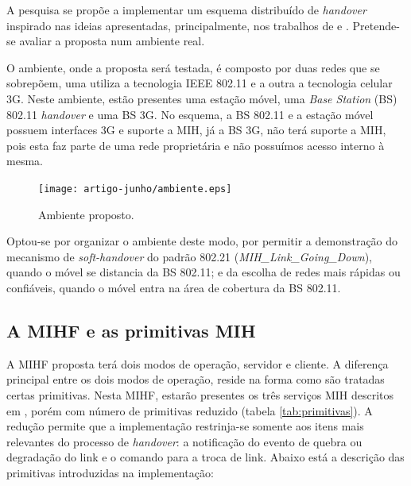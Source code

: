 \documentclass[12pt]{article}
\begin{document}
A pesquisa se propõe a implementar um esquema distribuído de \textit{handover} 
inspirado nas ideias apresentadas, principalmente, nos trabalhos de  
\cite{machan:2008} e \cite{tawil:2008}. Pretende-se avaliar a proposta num 
ambiente real.

O ambiente, onde a proposta será testada, é composto por duas redes que se 
sobrepõem, uma utiliza a tecnologia IEEE 802.11 e a outra a tecnologia celular 
3G.  Neste ambiente, estão presentes uma estação móvel, uma \textit{Base 
Station} (BS) 802.11 \textit{handover} e uma BS 3G.  No esquema, a BS 802.11 e 
a estação móvel possuem interfaces 3G e suporte a MIH, já a BS 3G, não terá 
suporte a MIH, pois esta faz parte de uma rede proprietária e não possuímos 
acesso interno à mesma.

\begin{figure}[h!]
	\centering
	\texttt{[image: artigo-junho/ambiente.eps]}
	\caption{Ambiente proposto.}
	\label{fig:ambiente}
\end{figure}

Optou-se por organizar o ambiente deste modo, por permitir a demonstração do 
mecanismo de \textit{soft-handover} do padrão 802.21 
(\textit{MIH\_Link\_Going\_Down}), quando o móvel se distancia da BS 802.11; e 
da escolha de redes mais rápidas ou confiáveis, quando o móvel entra na área 
de cobertura da BS 802.11.

\subsection{A MIHF e as primitivas MIH} %

A MIHF proposta terá dois modos de operação, servidor e cliente.  A diferença 
principal entre os dois modos de operação, reside na forma como são tratadas 
certas primitivas.  Nesta MIHF, estarão presentes os três serviços MIH 
descritos em \cite{ieee:2008:80221}, porém com número de primitivas reduzido 
(tabela \ref{tab:primitivas}). A redução permite que a implementação 
restrinja-se somente aos itens mais relevantes do processo de 
\textit{handover}: a notificação do evento de quebra ou degradação do link e o 
comando para a troca de link. Abaixo está a descrição das primitivas 
introduzidas na implementação:
\end{document}
